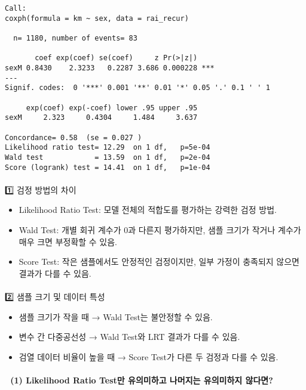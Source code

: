 \documentclass[
  letterpaper,
  DIV=11,
  numbers=noendperiod]{scrartcl}
\makeatletter
\let\oldparagraph\paragraph
\renewcommand{\paragraph}{
    \@ifstar
      \xxxParagraphStar
      \xxxParagraphNoStar
  }
\newcommand{\xxxParagraphStar}[1]{\oldparagraph*{#1}\mbox{}}
\newcommand{\xxxParagraphNoStar}[1]{\oldparagraph{#1}\mbox{}}
\providecommand{\tightlist}{%
  \setlength{\itemsep}{0pt}\setlength{\parskip}{0pt}}\usepackage{longtable,booktabs,array}
\makeatother
\begin{document}
\begin{verbatim}
Call:
coxph(formula = km ~ sex, data = rai_recur)

  n= 1180, number of events= 83 

       coef exp(coef) se(coef)     z Pr(>|z|)    
sexM 0.8430    2.3233   0.2287 3.686 0.000228 ***
---
Signif. codes:  0 '***' 0.001 '**' 0.01 '*' 0.05 '.' 0.1 ' ' 1

     exp(coef) exp(-coef) lower .95 upper .95
sexM     2.323     0.4304     1.484     3.637

Concordance= 0.58  (se = 0.027 )
Likelihood ratio test= 12.29  on 1 df,   p=5e-04
Wald test            = 13.59  on 1 df,   p=2e-04
Score (logrank) test = 14.41  on 1 df,   p=1e-04
\end{verbatim}

\paragraph{1️⃣ 검정 방법의
차이}\label{uxac80uxc815-uxbc29uxbc95uxc758-uxcc28uxc774}

\begin{itemize}
\tightlist
\item
  Likelihood Ratio Test: 모델 전체의 적합도를 평가하는 강력한 검정 방법.
\item
  Wald Test: 개별 회귀 계수가 0과 다른지 평가하지만, 샘플 크기가 작거나
  계수가 매우 크면 부정확할 수 있음.
\item
  Score Test: 작은 샘플에서도 안정적인 검정이지만, 일부 가정이 충족되지
  않으면 결과가 다를 수 있음.
\end{itemize}

\paragraph{2️⃣ 샘플 크기 및 데이터
특성}\label{uxc0d8uxd50c-uxd06cuxae30-uxbc0f-uxb370uxc774uxd130-uxd2b9uxc131}

\begin{itemize}
\tightlist
\item
  샘플 크기가 작을 때 → Wald Test는 불안정할 수 있음.
\item
  변수 간 다중공선성 → Wald Test와 LRT 결과가 다를 수 있음.
\item
  검열 데이터 비율이 높을 때 → Score Test가 다른 두 검정과 다를 수 있음.
\end{itemize}

\paragraph{\texorpdfstring{\textbf{📌 (1) Likelihood Ratio Test만
유의미하고 나머지는 유의미하지
않다면?}}{📌 (1) Likelihood Ratio Test만 유의미하고 나머지는 유의미하지 않다면?}}\label{likelihood-ratio-testuxb9cc-uxc720uxc758uxbbf8uxd558uxace0-uxb098uxba38uxc9c0uxb294-uxc720uxc758uxbbf8uxd558uxc9c0-uxc54auxb2e4uxba74}
\end{document}
